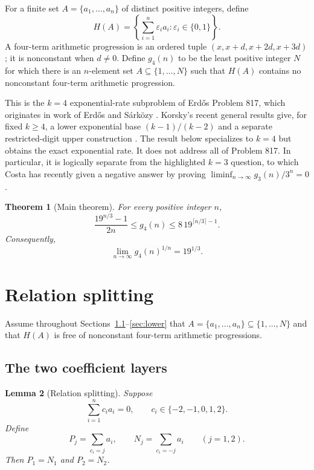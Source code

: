 \documentclass[11pt]{article}
\newtheorem{theorem}{Theorem}[section]
\newtheorem{lemma}[theorem]{Lemma}
\theoremstyle{remark}
\begin{document}
For a finite set $A=\{a_1,\ldots,a_n\}$ of distinct positive integers, define
\[
  H(A)=\left\{\sum_{i=1}^n\varepsilon_i a_i:
       \varepsilon_i\in\{0,1\}\right\}.
\]
A four-term arithmetic progression is an ordered tuple
$(x,x+d,x+2d,x+3d)$; it is nonconstant when $d\ne0$.  Define $g_4(n)$ to be
the least positive integer $N$ for which there is an $n$-element set
$A\subseteq\{1,\ldots,N\}$ such that $H(A)$ contains no nonconstant four-term
arithmetic progression.

This is the $k=4$ exponential-rate subproblem of Erd\H{o}s Problem 817, which
originates in work of Erd\H{o}s and S{\'a}rk{\"o}zy
\cite{ErdosSarkozy1992,Bloom817}.  Korsky's recent general results give, for
fixed $k\ge4$, a lower exponential base $(k-1)/(k-2)$ and a separate
restricted-digit upper construction \cite[Theorems 1.2 and 1.3]{Korsky2026}.
The result below specializes to $k=4$ but obtains the exact exponential rate.
It does not address all of Problem 817.  In particular, it is logically
separate from the highlighted $k=3$ question, to which Costa has recently
given a negative answer by proving
$\liminf_{n\to\infty}g_3(n)/3^n=0$ \cite{Costa2026}.

\begin{theorem}[Main theorem]\label{thm:main}
For every positive integer $n$,
\[
  \frac{19^{n/3}-1}{2n}
  \le g_4(n)
  \le 8\,19^{\lceil n/3\rceil-1}.
\]
Consequently,
\[
  \lim_{n\to\infty}g_4(n)^{1/n}=19^{1/3}.
\]
\end{theorem}

\section{Relation splitting}

Assume throughout Sections~\ref{sec:split}--\ref{sec:lower} that
$A=\{a_1,\ldots,a_n\}\subseteq\{1,\ldots,N\}$ and that $H(A)$ is free of
nonconstant four-term arithmetic progressions.

\subsection{The two coefficient layers}\label{sec:split}

\begin{lemma}[Relation splitting]\label{lem:split}
Suppose
\[
  \sum_{i=1}^n c_i a_i=0,
  \qquad c_i\in\{-2,-1,0,1,2\}.
\]
Define
\[
  P_j=\sum_{c_i=j}a_i,
  \qquad N_j=\sum_{c_i=-j}a_i
  \qquad(j=1,2).
\]
Then $P_1=N_1$ and $P_2=N_2$.
\end{lemma}
\end{document}

